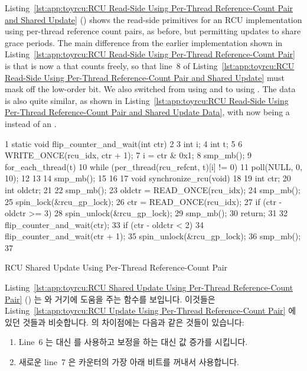 Listing~\ref{lst:app:toyrcu:RCU Read-Side Using Per-Thread Reference-Count Pair and Shared Update}
()
shows the read-side primitives for an RCU implementation using per-thread
reference count pairs, as before, but permitting updates to share
grace periods.
The main difference from the earlier implementation shown in
Listing~\ref{lst:app:toyrcu:RCU Read-Side Using Per-Thread Reference-Count Pair}
is that  is now a  that counts freely,
so that line~8 of
Listing~\ref{lst:app:toyrcu:RCU Read-Side Using Per-Thread Reference-Count Pair and Shared Update}
must mask off the low-order bit.
We also switched from using  and 
to using .
The data is also quite similar, as shown in
Listing~\ref{lst:app:toyrcu:RCU Read-Side Using Per-Thread Reference-Count Pair and Shared Update Data},
with  now being a  instead of an
.
\fi

\begin{listing}[tbp]
{ \scriptsize
\begin{verbbox}
  1 static void flip_counter_and_wait(int ctr)
  2 {
  3   int i;
  4   int t;
  5
  6   WRITE_ONCE(rcu_idx, ctr + 1);
  7   i = ctr & 0x1;
  8   smp_mb();
  9   for_each_thread(t) {
 10     while (per_thread(rcu_refcnt, t)[i] != 0) {
 11       poll(NULL, 0, 10);
 12     }
 13   }
 14   smp_mb();
 15 }
 16
 17 void synchronize_rcu(void)
 18 {
 19   int ctr;
 20   int oldctr;
 21
 22   smp_mb();
 23   oldctr = READ_ONCE(rcu_idx);
 24   smp_mb();
 25   spin_lock(&rcu_gp_lock);
 26   ctr = READ_ONCE(rcu_idx);
 27   if (ctr - oldctr >= 3) {
 28     spin_unlock(&rcu_gp_lock);
 29     smp_mb();
 30     return;
 31   }
 32   flip_counter_and_wait(ctr);
 33   if (ctr - oldctr < 2)
 34     flip_counter_and_wait(ctr + 1);
 35   spin_unlock(&rcu_gp_lock);
 36   smp_mb();
 37 }
\end{verbbox}
}
\centering
\theverbbox
\caption{RCU Shared Update Using Per-Thread Reference-Count Pair}
\label{lst:app:toyrcu:RCU Shared Update Using Per-Thread Reference-Count Pair}
\end{listing}

Listing~\ref{lst:app:toyrcu:RCU Shared Update Using Per-Thread Reference-Count Pair}
()
는  와 거기에 도움을 주는 
함수를 보입니다.
이것들은
Listing~\ref{lst:app:toyrcu:RCU Update Using Per-Thread Reference-Count Pair} 에 있던
것들과 비슷합니다.
 의 차이점에는 다음과 같은 것들이 있습니다:
\begin{enumerate}
\item	Line~6 는  대신  를 사용하고 보정을
	하는 대신 값 증가를 시킵니다.
\item	새로운 line~7 은 카운터의 가장 아래 비트를 꺼내서 사용합니다.
\end{enumerate}
\iffalse

